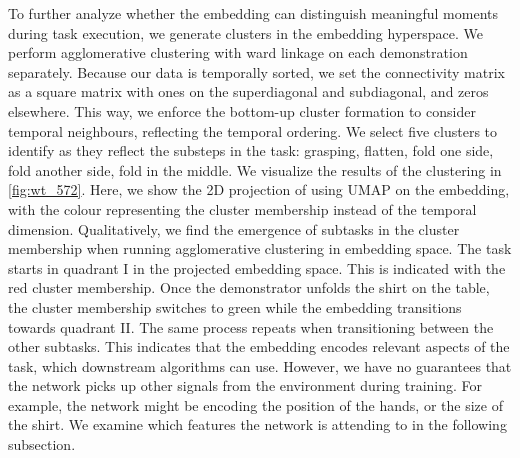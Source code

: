 \documentclass[\home/main.tex]{subfiles}
\begin{document}
To further analyze whether the embedding can distinguish meaningful moments during task execution, we generate clusters in the embedding hyperspace. We perform agglomerative clustering with ward linkage on each demonstration separately. Because our data is temporally sorted, we set the connectivity matrix as a square matrix with ones on the superdiagonal and subdiagonal, and zeros elsewhere. This way, we enforce the bottom-up cluster formation to consider temporal neighbours, reflecting the temporal ordering. We select five clusters to identify as they reflect the substeps in the task: grasping, flatten, fold one side, fold another side, fold in the middle. We visualize the results of the clustering in \cref{fig:wt_572}. Here, we show the 2D projection of using UMAP on the embedding, with the colour representing the cluster membership instead of the temporal dimension. Qualitatively, we find the emergence of subtasks in the cluster membership when running agglomerative clustering in embedding space. The task starts in quadrant I in the projected embedding space. This is indicated with the red cluster membership. Once the demonstrator unfolds the shirt on the table, the cluster membership switches to green while the embedding transitions towards quadrant II. The same process repeats when transitioning between the other subtasks. This indicates that the embedding encodes relevant aspects of the task, which downstream algorithms can use. However, we have no guarantees that the network picks up other signals from the environment during training. For example, the network might be encoding the position of the hands, or the size of the shirt. We examine which features the network is attending to in the following subsection.
\end{document}
